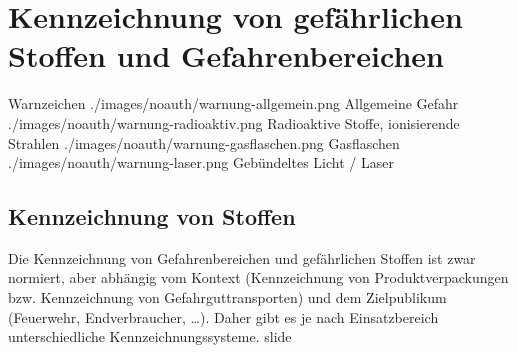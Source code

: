 \section{Kennzeichnung von gefährlichen Stoffen und
Gefahrenbereichen}
\label{topic:gefahrsymbole}

\begin{PictureSeries}{}{Warnzeichen}
{./images/noauth/warnung-allgemein.png}
{Allgemeine Gefahr}
{./images/noauth/warnung-radioaktiv.png}
{Radioaktive Stoffe, ionisierende
Strahlen}
{./images/noauth/warnung-gasflaschen.png}
{Gasflaschen}
{./images/noauth/warnung-laser.png}
{Gebündeltes Licht / Laser}
\end{PictureSeries}


\subsection{Kennzeichnung von Stoffen}

{ %
Die Kennzeichnung von Gefahrenbereichen und gefährlichen Stoffen ist zwar normiert, 
aber abhängig vom Kontext 
(Kennzeichnung von Produktverpackungen bzw. Kennzeichnung von Gefahrguttransporten) 
und dem Zielpublikum 
(Feuerwehr, Endverbraucher, \ldots). 
%
Daher gibt es je nach Einsatzbereich unterschiedliche Kennzeichnungssysteme. 
}
{slide}

